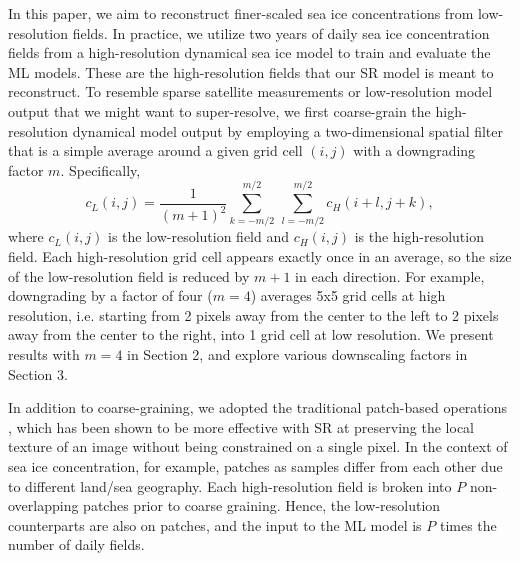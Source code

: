 \documentclass[]{copernicus}
\begin{document}
In this paper, we aim to reconstruct finer-scaled sea ice concentrations from low-resolution fields. In practice, we utilize two years of daily sea ice concentration fields from a high-resolution dynamical sea ice model to train and evaluate the ML models. These are the high-resolution fields that our SR model is meant to reconstruct. To resemble sparse satellite measurements or low-resolution model output that we might want to super-resolve, we first coarse-grain the high-resolution dynamical model output by employing a two-dimensional spatial filter that is a simple average around a given grid cell $(i, j)$ with a downgrading factor $m$. Specifically,
\begin{equation}
c_L(i,j)=\frac{1}{(m+1)^2}\sum_{k=-m/2}^{m/2} \ \sum_{l=-m/2}^{m/2} c_H(i+l,j+k),
\label{eq:coarsen}
\end{equation}
where $c_L(i,j)$ is the low-resolution field and $c_H(i,j)$ is the high-resolution field. Each high-resolution grid cell appears exactly once in an average, so the size of the low-resolution field is reduced by $m+1$ in each direction. For example, downgrading by a factor of four ($m = 4$) averages 5x5 grid cells at high resolution, i.e. starting from 2 pixels away from the center to the left to 2 pixels away from the center to the right, into 1 grid cell at low resolution.
We present results with $m=4$ in Section 2, and explore various downscaling factors in Section 3.  


In addition to coarse-graining, we adopted the traditional patch-based operations \citep{ram2013image}, which has been shown to be more effective with SR at preserving the local texture of an image without being constrained on a single pixel. In the context of sea ice concentration, for example, patches as samples differ from each other due to different land/sea geography. Each high-resolution field is broken into $P$ non-overlapping patches prior to coarse graining. Hence, the low-resolution counterparts are also on patches, and the input to the ML model is $P$ times the number of daily fields. 
\end{document}
